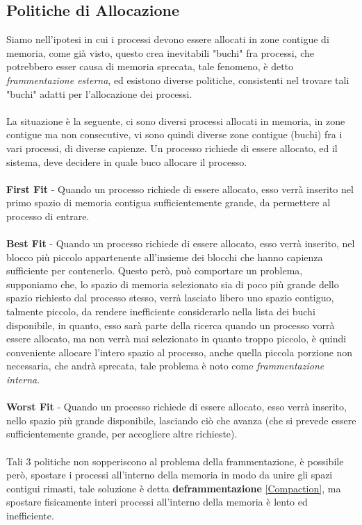 \documentclass[12pt, letterpaper]{article}
\newcommand{\acc}{\\\hphantom{}\\}
\begin{document}
\subsection{Politiche di Allocazione}
Siamo nell'ipotesi in cui i processi devono essere allocati in zone contigue di memoria, come già visto, questo 
crea inevitabili "buchi" fra processi, che potrebbero esser causa di memoria sprecata, tale fenomeno, è detto \textit{frammentazione 
esterna}, ed esistono diverse politiche, consistenti nel trovare tali "buchi" adatti per l'allocazione dei processi.\acc
La situazione è la seguente, ci sono diversi processi allocati in memoria, in zone contigue ma non consecutive, vi sono quindi 
diverse zone contigue (buchi) fra i vari processi, di diverse capienze. Un processo richiede di essere allocato, 
ed il sistema, deve decidere in quale buco allocare il processo.\acc 
\textbf{First Fit }- Quando un processo richiede di essere allocato, esso verrà inserito nel primo spazio di memoria 
contigua sufficientemente grande, da permettere al processo di entrare.\acc
\textbf{Best Fit} -  Quando un processo richiede di essere allocato, esso verrà inserito, nel blocco 
più piccolo appartenente all'insieme dei blocchi che hanno capienza sufficiente per contenerlo. Questo però, può 
comportare un problema, supponiamo che, lo spazio di memoria selezionato sia di poco più 
grande dello spazio richiesto dal processo stesso, verrà lasciato libero uno spazio contiguo, talmente piccolo, 
da rendere inefficiente considerarlo nella lista dei buchi disponibile, in quanto, esso sarà parte della ricerca quando 
un processo vorrà essere allocato, ma non verrà mai selezionato in quanto troppo piccolo, è quindi conveniente 
allocare l'intero spazio al processo, anche quella piccola porzione non necessaria, che andrà sprecata, tale problema 
è noto come \textit{frammentazione interna}.\acc 
\textbf{Worst Fit} - Quando un processo richiede di essere allocato, esso verrà inserito, nello spazio 
più grande disponibile, lasciando ciò che avanza (che si prevede essere sufficientemente grande, per accogliere altre richieste).\acc 
Tali 3 politiche non sopperiscono al problema della frammentazione, è possibile però, spostare i processi all'interno 
della memoria in modo da unire gli spazi contigui rimasti, tale soluzione è detta \textbf{deframmentazione} \ref{Compaction}, ma spostare 
fisicamente interi processi all'interno della memoria è lento ed inefficiente.
\end{document}
